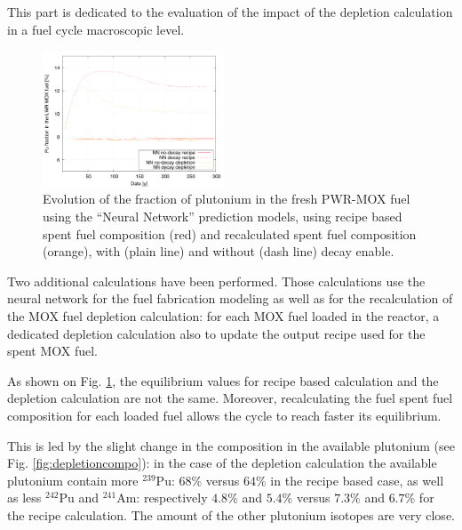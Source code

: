 \documentclass{anstrans}
\begin{document}
This part is dedicated to the evaluation of the impact of the depletion
calculation in a fuel cycle macroscopic level.

\begin{figure}[ht] %
  \centering
  \includegraphics[width=0.48\textwidth]{irradiation_pu_contribution.png}
  \caption{Evolution of the fraction of plutonium in the fresh PWR-MOX fuel
    using the ``Neural Network'' prediction models, using recipe based spent
    fuel composition (red) and recalculated spent fuel composition (orange),
  with (plain line) and without (dash line) decay enable.} 
  \label{fig:depletion}
\end{figure}

Two additional calculations have been performed. Those calculations use the
neural network for the fuel fabrication modeling as well as for the
recalculation of the MOX fuel depletion calculation: for each MOX fuel loaded in
the reactor, a dedicated depletion calculation also to update the output recipe
used for the spent MOX fuel.


As shown on Fig. \ref{fig:depletion}, the equilibrium values for recipe based
calculation and the depletion calculation are not the same. Moreover,
recalculating the fuel spent fuel composition for each loaded fuel allows the
cycle to reach faster its equilibrium. 

This is led by the slight change in the composition in the available plutonium
(see Fig. \ref{fig:depletioncompo}): in the case of the depletion calculation
the available plutonium contain more $^{239}$Pu: $68\%$ versus $64\%$ in the
recipe based case, as well as less $^{242}$Pu and $^{241}$Am: respectively
$4.8\%$ and $5.4\%$ versus $7.3\%$ and $6.7\%$ for the recipe calculation. The
amount of the other plutonium isotopes are very close.
\end{document}
